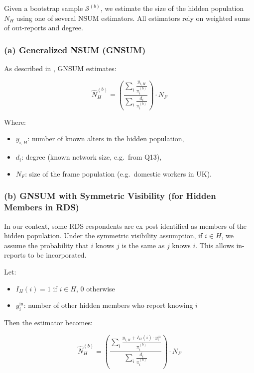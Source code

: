 \documentclass[
  12pt,
  letterpaper,
  DIV=11,
  numbers=noendperiod]{scrartcl}
\theoremstyle{plain}
\theoremstyle{definition}
\begin{document}
{Given a bootstrap sample \(\mathcal{S}^{(b)}\), we estimate the size of
the hidden population \(N_H\) using one of several NSUM estimators. All
estimators rely on weighted sums of out-reports and degree.

\subsubsection{(a) Generalized NSUM
(GNSUM)}\label{a-generalized-nsum-gnsum}

As described in \textcite{feeh16-generalizing}, GNSUM estimates:

\[\hat{N}_H^{(b)} = \left( \frac{\sum_{i} \frac{y_{i,H}}{\pi_i^{(b)}}}{\sum_{i} \frac{d_i}{\pi_i^{(b)}}} \right) \cdot N_F\]

Where:

\begin{itemize}
\item
  \(y_{i,H}\): number of known alters in the hidden population,
\item
  \(d_i\): degree (known network size, e.g.~from Q13),
\item
  \(N_F\): size of the frame population (e.g.~domestic workers in UK).
\end{itemize}

\subsubsection{(b) GNSUM with Symmetric Visibility (for Hidden Members
in
RDS)}\label{b-gnsum-with-symmetric-visibility-for-hidden-members-in-rds}

In our context, some RDS respondents are ex post identified as members
of the hidden population. Under the symmetric visibility assumption, if
\(i \in H\), we assume the probability that \(i\) knows \(j\) is the
same as \(j\) knows \(i\). This allows in-reports to be incorporated.

Let:

\begin{itemize}
\item
  \(I_H(i) = 1\) if \(i \in H\), 0 otherwise
\item
  \(y_{i}^{\text{in}}\): number of other hidden members who report
  knowing \(i\)
\end{itemize}

Then the estimator becomes:

\[\hat{N}_H^{(b)} = \left( \frac{\sum_{i} \frac{y_{i,H} + I_H(i) \cdot y_{i}^{\text{in}}}{\pi_i^{(b)}}}{\sum_{i} \frac{d_i}{\pi_i^{(b)}}} \right) \cdot N_F\]

}
\end{document}
